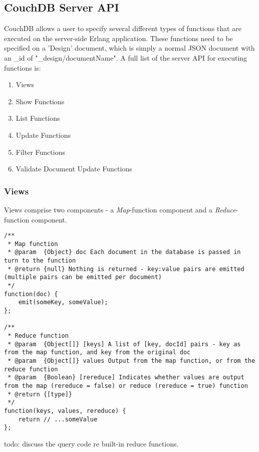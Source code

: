 \subsection{CouchDB Server API}
CouchDB allows a user to specify several different types of functions that are executed on the server-side Erlang application. These functions need to be specified on a 'Design' document, which is simply a normal JSON document with an \_id of "\_design/documentName". A full list of the server API for executing functions is:

\begin{enumerate}
    \item Views
    \item Show Functions
    \item List Functions
    \item Update Functions
    \item Filter Functions
    \item Validate Document Update Functions
\end{enumerate}

\subsubsection{Views}
Views comprise two components - a \textit{Map}-function component and a \textit{Reduce}-function component.

\begin{verbatim} 
/**
 * Map function
 * @param  {Object} doc Each document in the database is passed in turn to the function
 * @return {null} Nothing is returned - key:value pairs are emitted (multiple pairs can be emitted per document)
 */
function(doc) {
    emit(someKey, someValue);
};

/**
 * Reduce function
 * @param  {Object[]} [keys] A list of [key, docId] pairs - key as from the map function, and key from the original doc
 * @param  {Object[]} values Output from the map function, or from the reduce function
 * @param  {Boolean} [rereduce] Indicates whether values are output from the map (rereduce = false) or reduce (rereduce = true) function
 * @return {[type]}
 */
function(keys, values, rereduce) {
    return // ...someValue
};
\end{verbatim}

todo: discuss the query code re built-in reduce functions.


